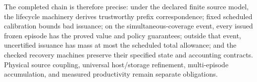 The completed chain is therefore precise: under the declared finite source
model, the lifecycle machinery derives trustworthy prefix correspondence;
fixed scheduled calibration bounds bad issuance; on the simultaneous-coverage
event, every issued frozen episode has the proved value and policy guarantees;
outside that event, uncertified issuance has mass at most the scheduled total
allowance; and the checked recovery machines preserve their specified state
and accounting contracts. Physical source coupling,
universal host/storage refinement, multi-episode accumulation, and measured
productivity remain separate obligations.
